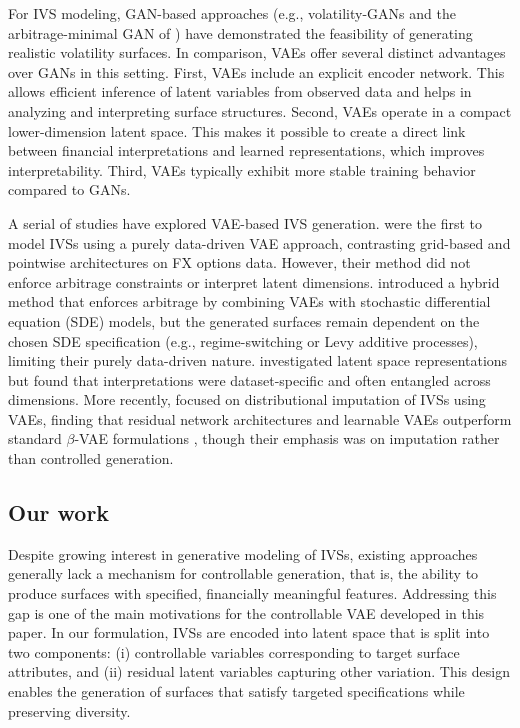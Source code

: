 \documentclass{article}
\begin{document}
For IVS modeling, GAN-based approaches (e.g., volatility-GANs \citep{Vuletic03072024} and the arbitrage-minimal GAN of \citep{na2023computingvolatilitysurfacesusing}) have demonstrated the feasibility of generating realistic volatility surfaces. In comparison, VAEs offer several distinct advantages over GANs in this setting. First, VAEs include an explicit encoder network. This allows efficient inference of latent variables from observed data and helps in analyzing and interpreting surface structures. Second, VAEs operate in a compact lower-dimension latent space. This makes it possible to create a direct link between financial interpretations and learned representations, which improves interpretability. Third, VAEs typically exhibit more stable training behavior compared to GANs.

A serial of  studies have explored VAE-based IVS generation. \citep{bergeron2021variational} were the first to model IVSs using a purely data-driven VAE approach, contrasting grid-based and pointwise architectures on FX options data. However, their method did not enforce arbitrage constraints or interpret latent dimensions. \citep{ning2023arbitrage} introduced a hybrid method that enforces arbitrage by combining VAEs with stochastic differential equation (SDE) models, but the generated surfaces remain dependent on the chosen SDE specification (e.g., regime-switching or Levy additive processes), limiting their purely data-driven nature. \citep{kunsagi2023deep} investigated latent space representations but found that interpretations were dataset-specific and often entangled across dimensions. More recently, \citep{gopal2024filling} focused on distributional imputation of IVSs using VAEs, finding that residual network architectures and learnable VAEs outperform standard $\beta$-VAE formulations \citep{higgins2017beta}, though their emphasis was on imputation rather than controlled generation.


\subsection{Our work}

Despite growing interest in generative modeling of IVSs, existing approaches generally lack a mechanism for controllable generation, that is,  the ability to produce surfaces with specified, financially meaningful features. Addressing this gap is one of the main motivations for the controllable VAE developed in this paper.  
In our formulation, IVSs are encoded into latent space that is split into two components: (i) controllable variables corresponding to target surface attributes, and (ii) residual latent variables capturing other variation. This design enables the generation of surfaces that satisfy targeted specifications while preserving diversity.
\end{document}
